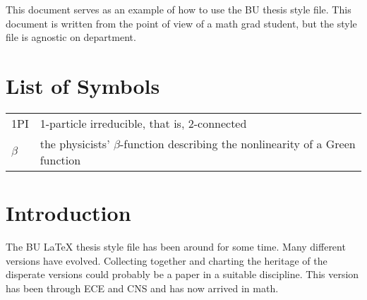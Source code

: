 \documentclass[11pt]{report}
\begin{document}
\begin{abstractpage}
This document serves as an example of how to use the BU thesis style
file.  This document is written from the point of view of a math grad student,
but the style file is agnostic on department.
\end{abstractpage}


\tableofcontents



\chapter*{List of Symbols}
  \begin{tabular}{lp{}}
    1PI \dotfill & 1-particle irreducible, that is, 2-connected \\
    $\beta$ \dotfill & the physicists' $\beta$-function describing the
    nonlinearity of a Green function \\
  \end{tabular}


\newpage
\endofprelim


\chapter{Introduction}
The BU {\LaTeX} thesis style file has been around for some time.  Many
different versions have evolved.  Collecting together and charting the
heritage of the disperate versions could probably be a paper in a
suitable discipline.  This version has been through ECE and CNS and
has now arrived in math.
\end{document}
